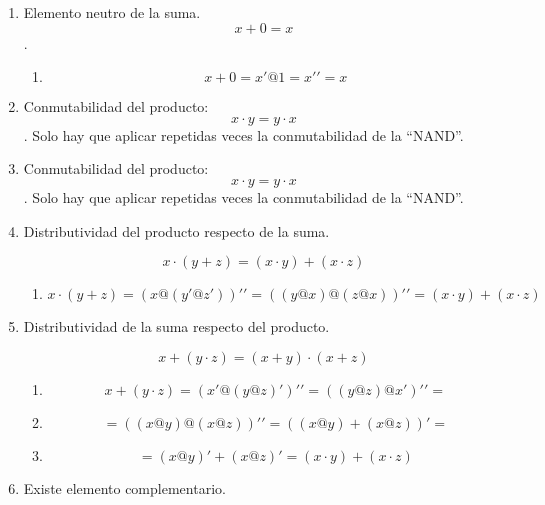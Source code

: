 \begin{enumerate}
\begin{enumerate}
\begin{enumerate}
\begin{enumerate}
\begin{enumerate}
          \begin{enumerate}
          \def\labelenumvi{\arabic{enumvi}.}
          \tightlist
          \item
            \[{{x \cdot 1} = {({x@1})}}{' = {({x@1})}}@{{({x@x'})} =}\]
          \item
            \[{= {({x@1})}}@{1 = x}'@{1 = x}'{' = x}\]
          \end{enumerate}
        \item
          Elemento neutro de la suma. \[{x + 0} = x\].

          \begin{enumerate}
          \def\labelenumvi{\arabic{enumvi}.}
          \tightlist
          \item
            \[{{{x + 0} = {x'@1}} = x}'{' = x}\]
          \end{enumerate}
        \item
          Conmutabilidad del producto: \[{x \cdot y} = {y \cdot x}\].
          Solo hay que aplicar repetidas veces la conmutabilidad de la
          ``NAND''.
        \item
          Conmutabilidad del producto: \[{x \cdot y} = {y \cdot x}\].
          Solo hay que aplicar repetidas veces la conmutabilidad de la
          ``NAND''.
        \item
          Distributividad del producto respecto de la suma.

          \[{x \cdot {({y + z})}} = {{({x \cdot y})} + {({x \cdot z})}}\]

          \begin{enumerate}
          \def\labelenumvi{\arabic{enumvi}.}
          \tightlist
          \item
            \[{{x \cdot {({y + z})}} = {({x@{({y'@z'})}})}}'{' = {({{({y@x})}@{({z@x})}})}}'{' = {{({x \cdot y})} + {({x \cdot z})}}}\]
          \end{enumerate}
        \item
          Distributividad de la suma respecto del producto.

          \[{x + {({y \cdot z})}} = {{({x + y})} \cdot {({x + z})}}\]

          \begin{enumerate}
          \def\labelenumvi{\arabic{enumvi}.}
          \tightlist
          \item
            \[{{x + {({y \cdot z})}} = {({{x'}@{({y@z})}'})}}'{' = {({{({y@z})}@{x'}})}}'{' =}\]
          \item
            \[{= {({{({x@y})}@{({x@z})}})}}'{' = {({{({x@y})} + {({x@z})}})}}{' =}\]
          \item
            \[{= {({x@y})}}{' + {({x@z})}}{' = {{({x \cdot y})} + {({x \cdot z})}}}\]
          \end{enumerate}
        \item
          Existe elemento complementario.


\end{enumerate}
\end{enumerate}
\end{enumerate}
\end{enumerate}
\end{enumerate}
